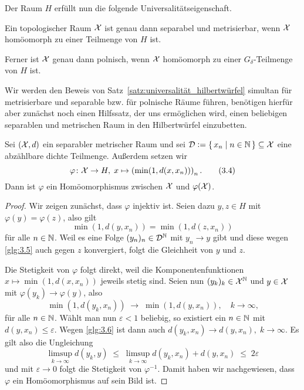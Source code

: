 \documentclass[../thesis/thesis.tex]{subfiles}
\begin{document}
	Der Raum $H$ erfüllt nun die folgende Universalitätseigenschaft.
	
	\begin{Satz}
		\label{satz:universalität_hilbertwürfel}
		Ein topologischer Raum $\mathcal{X}$ ist genau dann separabel und metrisierbar, wenn $\mathcal{X}$ homöomorph zu einer Teilmenge von $H$ ist.
		
		Ferner ist $\mathcal{X}$ genau dann polnisch, wenn $\mathcal{X}$ homöomorph zu einer $G_\delta$-Teilmenge von $H$ ist.
	\end{Satz}
	
	Wir werden den Beweis von Satz~\ref{satz:universalität_hilbertwürfel} simultan für metrisierbare und 
	separable bzw. für polnische Räume führen, benötigen hierfür aber zunächst noch einen Hilfssatz, der uns ermöglichen wird, 
	einen beliebigen separablen und metrischen Raum in den Hilbertwürfel einzubetten.
	
	\begin{Hilfssatz}
		\label{hilfssatz:einbettung_hilbertwürfel}
		Sei $(\mathcal{X}, d)$ ein separabler metrischer Raum und sei 
		$\mathcal{D} \vcentcolon = \left\{\, x_n \; \middle| \; n \in \mathbb{N} \,\right\} \subseteq \mathcal{X}$ eine abzählbare 
		dichte Teilmenge. Außerdem setzen wir
		\[\varphi \colon \mathcal{X} \to H, \; x \mapsto \left(\min (1, d(x, x_n)) \right)_n  \text{.} \label{glg:3.4} \tag{3.4}\]
		Dann ist $\varphi$ ein Homöomorphismus zwischen $\mathcal{X}$ und $\varphi(\mathcal{X})$.
	\end{Hilfssatz}
	
	\begin{proof}
		Wir zeigen zunächst, dass $\varphi$ injektiv ist. 
		Seien dazu $y, z \in H$ mit $\varphi(y) = \varphi(z)$, also gilt
		\[\min (1, d(y, x_n)) = \min (1, d(z, x_n)) \label{glg:3.5} \tag{3.5}\]
		für alle $n \in \mathbb{N}$. Weil es eine Folge $(y_n)_n \in \mathcal{D}^{\mathbb{N}}$ mit 
		$y_n \to y$ gibt und diese wegen \eqref{glg:3.5} auch gegen $z$ 
		konvergiert, folgt die Gleichheit von $y$ und $z$.
		
		Die Stetigkeit von $\varphi$ folgt direkt, weil die 
		Komponentenfunktionen $x \mapsto \min (1, d(x, x_n))$ jeweils stetig sind. 
		Seien nun $(y_k)_k \in \mathcal{X}^{\mathbb{N}}$ und $y \in \mathcal{X}$ mit $\varphi(y_k) \to \varphi(y)$, 
		also
		\[\min (1, d(y_k, x_n)) \; \to \; \min (1, d(y, x_n)), 
		\quad k \to \infty \text{,} \label{glg:3.6} \tag{3.6}\]
		für alle $n \in \mathbb{N}$. Wählt man nun $\varepsilon < 1$ beliebig, 
		so existiert ein $n \in \mathbb{N}$ mit $d(y, x_n) \leq \varepsilon$. 
		Wegen \eqref{glg:3.6} ist dann auch
		$d(y_k, x_n) \to d(y, x_n), \; k \to \infty$. Es gilt also die Ungleichung
		$$\limsup_{k \to \infty} d(y_k, y) \; \leq \; 
		\limsup_{k \to \infty} d(y_k, x_n) + d(y, x_n) \; \leq \; 2\varepsilon$$
		und mit $\varepsilon \to 0$ folgt die Stetigkeit von $\varphi^{-1}$. 
		Damit haben wir nachgewiesen, dass $\varphi$ ein Homöomorphismus auf sein Bild ist. 
	\end{proof}
\end{document}

